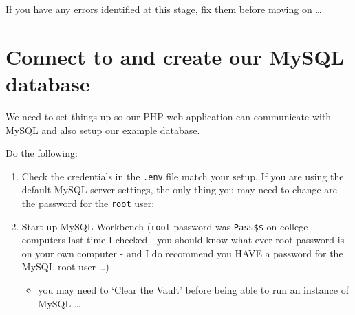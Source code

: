 \documentclass[a4paperpaper,openright]{book}
\newenvironment{Shaded}{}{}
\newcommand{\ExtensionTok}[1]{#1}
\newcommand{\NormalTok}[1]{#1}
\newcommand{\OperatorTok}[1]{\textcolor[rgb]{0.40,0.40,0.40}{#1}}
\providecommand{\tightlist}{%
  \setlength{\itemsep}{0pt}\setlength{\parskip}{0pt}}
\begin{document}
\begin{Shaded}
\end{Shaded}

If you have any errors identified at this stage, fix them before moving
on \ldots{}

\hypertarget{connect-to-and-create-our-mysql-database}{%
\chapter{Connect to and create our MySQL
database}\label{connect-to-and-create-our-mysql-database}}

We need to set things up so our PHP web application can communicate with
MySQL and also setup our example database.

Do the following:

\begin{enumerate}
\def\labelenumi{\arabic{enumi}.}
\item
  Check the credentials in the \texttt{.env} file match your setup. If
  you are using the default MySQL server settings, the only thing you
  may need to change are the password for the \texttt{root} user:
\item
  Start up MySQL Workbench (\texttt{root} password was \texttt{Pass\$\$}
  on college computers last time I checked - you should know what ever
  root password is on your own computer - and I do recommend you HAVE a
  password for the MySQL root user \ldots{})

  \begin{itemize}
  \tightlist
  \item
    you may need to `Clear the Vault' before being able to run an
    instance of MySQL \ldots{}
  \end{itemize}
\end{enumerate}
\end{document}
